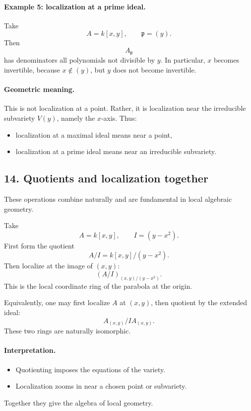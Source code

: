 \documentclass[12pt,a4paper]{article}
\theoremstyle{plain}
\theoremstyle{definition}      %
\begin{document}
	\paragraph{Example 5: localization at a prime ideal.}
	Take
	\[
	A=k[x,y], \qquad \mathfrak p=(y).
	\]
	Then
	\[
	A_{\mathfrak p}
	\]
	has denominators all polynomials not divisible by \(y\). In particular, \(x\) becomes invertible, because \(x\notin (y)\), but \(y\) does not become invertible.
	
	\paragraph{Geometric meaning.}
	This is not localization at a point. Rather, it is localization near the irreducible subvariety \(V(y)\), namely the \(x\)-axis. Thus:
	\begin{itemize}
		\item localization at a maximal ideal means near a point,
		\item localization at a prime ideal means near an irreducible subvariety.
	\end{itemize}
	
	\subsection*{14. Quotients and localization together}
	
	These operations combine naturally and are fundamental in local algebraic geometry.
	
	Take
	\[
	A=k[x,y], \qquad I=(y-x^2).
	\]
	First form the quotient
	\[
	A/I = k[x,y]/(y-x^2).
	\]
	Then localize at the image of \((x,y)\):
	\[
	(A/I)_{(x,y)/(y-x^2)}.
	\]
	This is the local coordinate ring of the parabola at the origin.
	
	Equivalently, one may first localize \(A\) at \((x,y)\), then quotient by the extended ideal:
	\[
	A_{(x,y)} / IA_{(x,y)}.
	\]
	These two rings are naturally isomorphic.
	
	\paragraph{Interpretation.}
	\begin{itemize}
		\item Quotienting imposes the equations of the variety.
		\item Localization zooms in near a chosen point or subvariety.
	\end{itemize}
	Together they give the algebra of local geometry.
	
\end{document}
